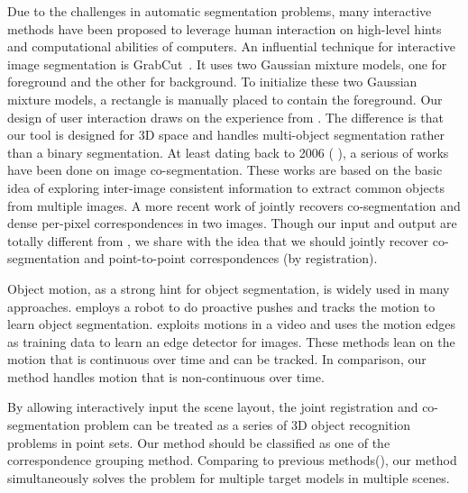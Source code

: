 %
Due to the challenges in automatic segmentation problems, many interactive methods have been proposed to leverage human interaction on high-level hints and computational abilities of computers.
%
An influential technique for interactive image segmentation is GrabCut~\cite{grabcut}. 
It uses two Gaussian mixture models, one for foreground and the other for background. 
To initialize these two Gaussian mixture models, a rectangle is manually placed to contain the foreground. 
Our design of user interaction draws on the experience from \cite{grabcut}. 
%
The difference is that our tool is designed for 3D space and handles multi-object segmentation rather than a binary segmentation. 
%
At least dating back to 2006 ( \cite{COSEG} ), a serious of works have been done on image co-segmentation.
These works are based on the basic idea of exploring inter-image consistent information to extract common objects from multiple images.
%
A more recent work of \cite{Taniai_2016_CVPR} jointly recovers co-segmentation and dense per-pixel correspondences in two images. 
Though our input and output are totally different from \cite{Taniai_2016_CVPR}, we share with \cite{Taniai_2016_CVPR} the idea that we should jointly recover co-segmentation and point-to-point correspondences (by registration).

Object motion, as a strong hint for object segmentation, is widely used in many approaches.
\cite{Xu:2015:ACS:2816795.2818075} employs a robot to do proactive pushes and tracks the motion to learn object segmentation. 
\cite{unsupervisededge} exploits motions in a video and uses the motion edges as training data to learn an edge detector for images.
These methods lean on the motion that is continuous over time and can be tracked. 
In comparison, our method handles motion that is non-continuous over time.

By allowing interactively input the scene layout, the joint registration and co-segmentation problem can be treated as a series of 3D object recognition problems in point sets. 
%
Our method should be classified as one of the correspondence grouping method. 
Comparing to previous methods(\cite{hough,LOF}), our method simultaneously solves the problem for multiple target models in multiple scenes.
